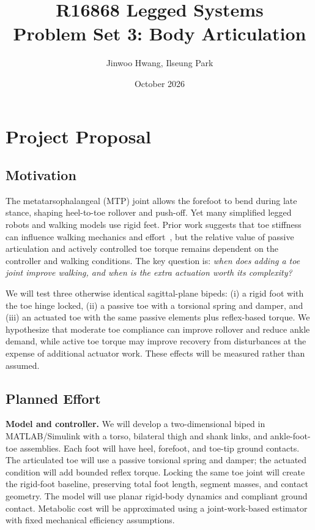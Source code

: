 \documentclass[11pt,letterpaper]{article}
\title{R16868 Legged Systems\\Problem Set 3: Body Articulation}
\author{Jinwoo Hwang, Ilseung Park}
\date{October 2026}
\begin{document}
\maketitle

\clearpage

\section{Project Proposal}

\subsection{Motivation}
The metatarsophalangeal (MTP) joint allows the forefoot to bend during late stance, shaping heel-to-toe rollover and push-off. Yet many simplified legged robots and walking models use rigid feet. Prior work suggests that toe stiffness can influence walking mechanics and effort~\cite{cho2025,sun2016}, but the relative value of passive articulation and actively controlled toe torque remains dependent on the controller and walking conditions. The key question is: \emph{when does adding a toe joint improve walking, and when is the extra actuation worth its complexity?}

We will test three otherwise identical sagittal-plane bipeds: (i) a rigid foot with the toe hinge locked, (ii) a passive toe with a torsional spring and damper, and (iii) an actuated toe with the same passive elements plus reflex-based torque. We hypothesize that moderate toe compliance can improve rollover and reduce ankle demand, while active toe torque may improve recovery from disturbances at the expense of additional actuator work. These effects will be measured rather than assumed.

\subsection{Planned Effort}
\textbf{Model and controller.} We will develop a two-dimensional biped in MATLAB/Simulink with a torso, bilateral thigh and shank links, and ankle-foot-toe assemblies. Each foot will have heel, forefoot, and toe-tip ground contacts. The articulated toe will use a passive torsional spring and damper; the actuated condition will add bounded reflex torque. Locking the same toe joint will create the rigid-foot baseline, preserving total foot length, segment masses, and contact geometry. The model will use planar rigid-body dynamics and compliant ground contact.
Metabolic cost will be approximated using a joint-work-based estimator
with fixed mechanical efficiency assumptions.
\end{document}
